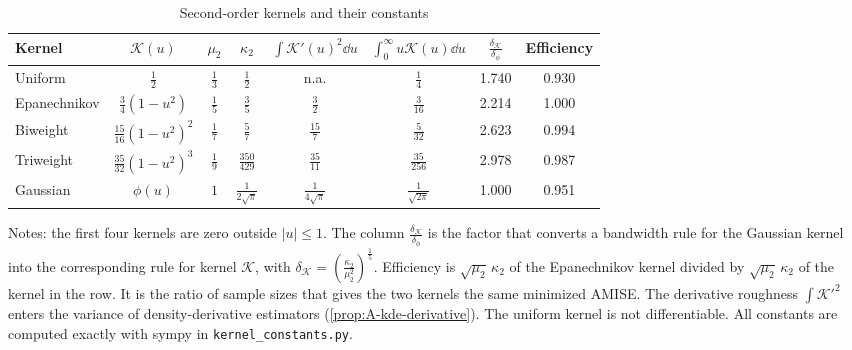 \begin{table}[htbp]
\centering
\caption{Second-order kernels and their constants}\label{tab:A-kernels}
\begin{tabular}{lccccccc}
\toprule
Kernel & $\mathcal{K}(u)$ & $\mu_2$ & $\kappa_2$ & $\int\mathcal{K}'(u)^2\dd u$ & $\int_0^\infty u\mathcal{K}(u)\dd u$
 & $\frac{\delta_{\mathcal{K}}}{\delta_\phi}$ & Efficiency \\
\midrule
Uniform & $\frac{1}{2}$ & $\frac{1}{3}$ & $\frac{1}{2}$ & n.a. & $\frac{1}{4}$ & 1.740 & 0.930 \\[2pt]
Epanechnikov & $\frac{3}{4}(1-u^2)$ & $\frac{1}{5}$ & $\frac{3}{5}$ & $\frac{3}{2}$ & $\frac{3}{16}$ & 2.214 & 1.000 \\[2pt]
Biweight & $\frac{15}{16}(1-u^2)^2$ & $\frac{1}{7}$ & $\frac{5}{7}$ & $\frac{15}{7}$ & $\frac{5}{32}$ & 2.623 & 0.994 \\[2pt]
Triweight & $\frac{35}{32}(1-u^2)^3$ & $\frac{1}{9}$ & $\frac{350}{429}$ & $\frac{35}{11}$ & $\frac{35}{256}$ & 2.978 & 0.987 \\[2pt]
Gaussian & $\phi(u)$ & $1$ & $\frac{1}{2\sqrt\pi}$ & $\frac{1}{4\sqrt\pi}$ & $\frac{1}{\sqrt{2\pi}}$ & 1.000 & 0.951 \\
\bottomrule
\end{tabular}
\par\smallskip
\begin{minipage}{0.97\textwidth}
\footnotesize Notes: the first four kernels are zero outside $|u|\le1$. The column
$\frac{\delta_{\mathcal{K}}}{\delta_\phi}$ is the factor that converts a bandwidth rule for the Gaussian
kernel into the corresponding rule for kernel $\mathcal{K}$, with
$\delta_{\mathcal{K}}=(\frac{\kappa_2}{\mu_2^2})^{\frac{1}{5}}$. Efficiency is $\sqrt{\mu_2}\,\kappa_2$ of
the Epanechnikov kernel divided by $\sqrt{\mu_2}\,\kappa_2$ of the kernel in the row. It is the ratio of
sample sizes that gives the two kernels the same minimized AMISE. The
derivative roughness $\int\mathcal{K}'^2$ enters the variance of density-derivative estimators
(\cref{prop:A-kde-derivative}). The uniform kernel is not differentiable. All constants are computed
exactly with sympy in \texttt{kernel\_constants.py}.
\end{minipage}
\end{table}

